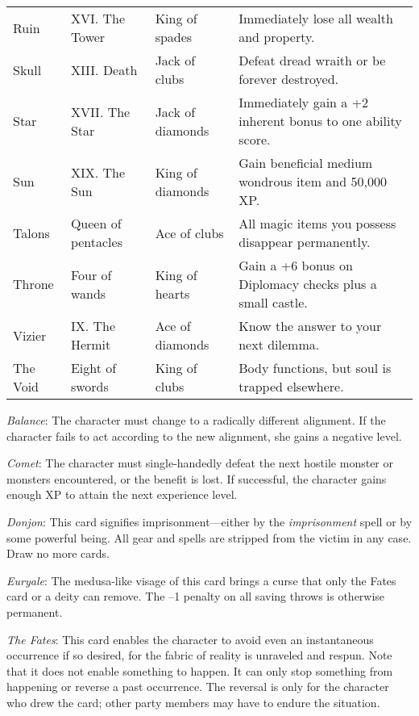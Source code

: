 \begin{table}[]
\begin{tabular}{llll}
Ruin            & XVI. The Tower      & King of spades            & Immediately lose all wealth and property.                  \\
Skull           & XIII. Death         & Jack of clubs             & Defeat dread wraith or be forever destroyed.               \\
Star            & XVII. The Star      & Jack of diamonds          & Immediately gain a +2 inherent bonus to one ability score. \\
Sun             & XIX. The Sun        & King of diamonds          & Gain beneficial medium wondrous item and 50,000 XP.        \\
Talons          & Queen of pentacles  & Ace of clubs              & All magic items you possess disappear permanently.         \\
Throne          & Four of wands       & King of hearts            & Gain a +6 bonus on Diplomacy checks plus a small castle.   \\
Vizier          & IX. The Hermit      & Ace of diamonds           & Know the answer to your next dilemma.                      \\
The Void        & Eight of swords     & King of clubs             & Body functions, but soul is trapped elsewhere.            
\end{tabular}
\end{table}

\textit{Balance}: The character must change to a radically different alignment. If the character fails to act according to the new alignment, she gains a negative level.
				
\textit{Comet}: The character must single-handedly defeat the next hostile monster or monsters encountered, or the benefit is lost. If successful, the character gains enough XP to attain the next experience level.
				
\textit{Donjon}: This card signifies imprisonment---either by the \textit{imprisonment }spell or by some powerful being. All gear and spells are stripped from the victim in any case. Draw no more cards.
				
\textit{Euryale}: The medusa-like visage of this card brings a curse that only the Fates card or a deity can remove. The --1 penalty on all saving throws is otherwise permanent.
				
\textit{The Fates}: This card enables the character to avoid even an instantaneous occurrence if so desired, for the fabric of reality is unraveled and respun. Note that it does not enable something to happen. It can only stop something from happening or reverse a past occurrence. The reversal is only for the character who drew the card; other party members may have to endure the situation.
				
